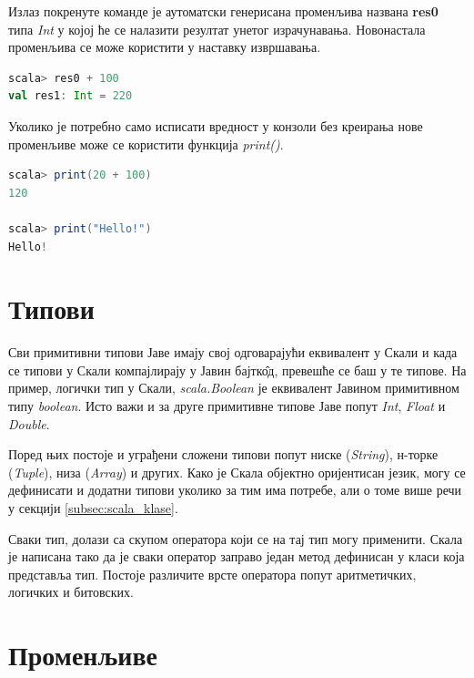 \documentclass[12pt,oneside]{memoir}
\begin{document}
Излаз покренуте команде је аутоматски генерисана променљива названа \textbf{res0} типа \textit{Int} у којој ће се налазити резултат унетог израчунавања. Новонастала променљива се може користити у наставку извршавања. \cite{scala_prog}

\begin{lstlisting}[language=Scala, caption={Коришћење резултатских променљивих}, label={lst:scala_res0_example}]
scala> res0 + 100
val res1: Int = 220
\end{lstlisting}

Уколико је потребно само исписати вредност у конзоли без креирања нове променљиве може се користити функција \textit{print()}.

\begin{lstlisting}[language=Scala, caption={Функција print}, label={lst:scala_interpret_print_func}]
scala> print(20 + 100)
120

scala> print("Hello!")
Hello!
\end{lstlisting}

\section{Типови}
\label{sec:scala_tip}

Сви примитивни типови Јаве имају свој одговарајући еквивалент у Скали и када се типови у Скали компајлирају у Јавин бајтк\^{о}д, превешће се баш у те типове. На пример, логички тип у Скали, \textit{scala.Boolean} је еквивалент Јавином примитивном типу \textit{boolean}. Исто важи и за друге примитивне типове Јаве попут \textit{Int}, \textit{Float} и \textit{Double}. \cite{scala_prog}

Поред њих постоје и уграђени сложени типови попут ниске (\textit{String}), н-торке (\textit{Tuple}), низа (\textit{Array}) и других. Како је Скала објектно оријентисан језик, могу се дефинисати и додатни типови уколико за тим има потребе, али о томе више речи у секцији \ref{subsec:scala_klase}.

Сваки тип, долази са скупом оператора који се на тај тип могу применити. Скала је написана тако да је сваки оператор заправо један метод дефинисан у класи која представља тип. Постоје различите врсте оператора попут аритметичких, логичких и битовских.

\section{Променљиве}
\label{sec:scala_prom}
\end{document}
